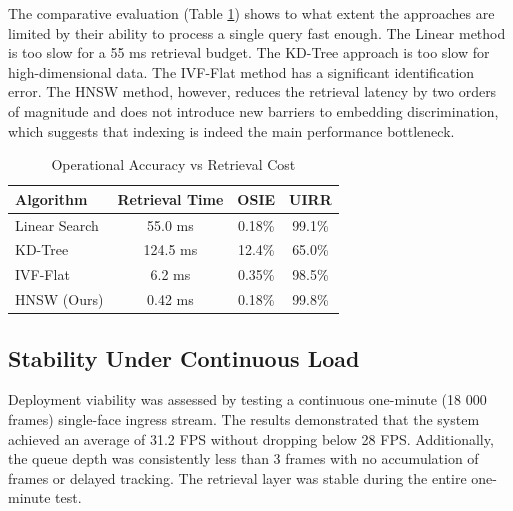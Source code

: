 \documentclass[conference]{IEEEtran}
\begin{document}
The comparative evaluation (Table \ref{tab:baseline_collapse}) shows to what extent the approaches are limited by their ability to process a single query fast enough. The Linear method is too slow for a 55 ms retrieval budget. The KD-Tree approach is too slow for high-dimensional data. The IVF-Flat method has a significant identification error. The HNSW method, however, reduces the retrieval latency by two orders of magnitude and does not introduce new barriers to embedding discrimination, which suggests that indexing is indeed the main performance bottleneck.

\begin{table}[htbp]
\caption{Operational Accuracy vs Retrieval Cost}
\begin{center}
\begin{tabular}{|l|c|c|c|}
\hline
Algorithm & Retrieval Time & OSIE & UIRR \\
\hline
Linear Search & 55.0 ms & 0.18\% & 99.1\% \\
\hline
KD-Tree & 124.5 ms & 12.4\% & 65.0\% \\
\hline
IVF-Flat & 6.2 ms & 0.35\% & 98.5\% \\
\hline
HNSW (Ours) & 0.42 ms & 0.18\% & 99.8\% \\
\hline
\end{tabular}
\end{center}
\label{tab:baseline_collapse}
\end{table}

\subsection{Stability Under Continuous Load}
Deployment viability was assessed by testing a continuous one-minute (18 000 frames) single-face ingress stream. The results demonstrated that the system achieved an average of 31.2 FPS without dropping below 28 FPS. Additionally, the queue depth was consistently less than 3 frames with no accumulation of frames or delayed tracking. The retrieval layer was stable during the entire one-minute test.
\end{document}
